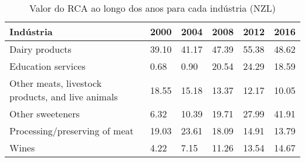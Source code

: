 \begin{table}
\centering
\caption{Valor do RCA ao longo dos anos para cada indústria (NZL)}
\begin{tabular}{p{6cm}p{1.5cm}p{1.5cm}p{1.5cm}p{1.5cm}p{1.5cm}}
\toprule
                                        Indústria &  2000 &  2004 &  2008 &  2012 &  2016 \\
\midrule
                                   Dairy products & 39.10 & 41.17 & 47.39 & 55.38 & 48.62 \\
                               Education services &  0.68 &  0.90 & 20.54 & 24.29 & 18.59 \\
Other meats, livestock products, and live animals & 18.55 & 15.18 & 13.37 & 12.17 & 10.05 \\
                                 Other sweeteners &  6.32 & 10.39 & 19.71 & 27.99 & 41.91 \\
                    Processing/preserving of meat & 19.03 & 23.61 & 18.09 & 14.91 & 13.79 \\
                                            Wines &  4.22 &  7.15 & 11.26 & 13.54 & 14.67 \\
\bottomrule
\end{tabular}
\end{table}
